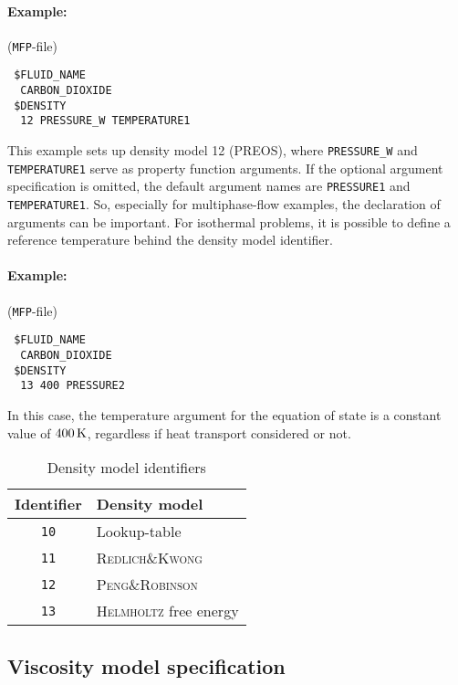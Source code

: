 \paragraph{Example:}
(\texttt{MFP}-file)
\begin{verbatim}
 $FLUID_NAME
  CARBON_DIOXIDE
 $DENSITY
  12 PRESSURE_W TEMPERATURE1
\end{verbatim}

This example sets up density model 12 (PREOS), where \texttt{PRESSURE\_W} and \texttt{TEMPERATURE1} serve as property function arguments. If the optional argument specification is omitted, the default argument names are \texttt{PRESSURE1} and \texttt{TEMPERATURE1}. So, especially for multiphase-flow examples, the declaration of arguments can be important. For isothermal problems, it is possible to define a reference temperature behind the density model identifier.

\paragraph{Example:}
(\texttt{MFP}-file)
\begin{verbatim}
 $FLUID_NAME
  CARBON_DIOXIDE
 $DENSITY
  13 400 PRESSURE2
\end{verbatim}

In this case, the temperature argument for the equation of state is a constant value of $\unit[400]{K}$, regardless if heat transport considered or not.

\begin{table}[ht]
\caption{Density model identifiers}
\begin{center}
\begin{tabular}{cl}
\toprule
Identifier & Density model \\
\midrule
\texttt{10} & Lookup-table\\
\texttt{11} & \textsc{Redlich\&Kwong} \\
\texttt{12} & \textsc{Peng\&Robinson} \\
\texttt{13} & \textsc{Helmholtz} free energy\\
\bottomrule
\end{tabular}
\end{center}
\label{tab-density-models}
\end{table}

\subsection{Viscosity model specification}

